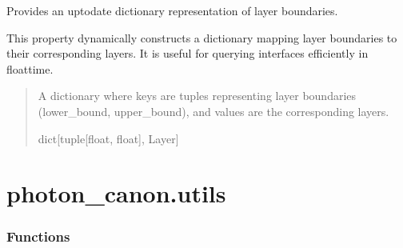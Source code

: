 \documentclass[letterpaper,10pt,english]{sphinxmanual}
\begin{document}
\begin{fulllineitems}
\begin{fulllineitems}
\label{\detokenize{generated/photon_canon.optics:photon_canon.optics.System.stack}}
\pysigstartsignatures
\pysigline
{}
\pysigstopsignatures
\sphinxAtStartPar
Provides an up\sphinxhyphen{}to\sphinxhyphen{}date dictionary representation of layer boundaries.

\sphinxAtStartPar
This property dynamically constructs a dictionary mapping layer boundaries to their corresponding
layers. It is useful for querying interfaces efficiently in float\sphinxhyphen{}time.
\begin{quote}\begin{description}
\sphinxAtStartPar
A dictionary where keys are tuples representing layer boundaries (lower\_bound, upper\_bound),
and values are the corresponding layers.

\sphinxAtStartPar
dict{[}tuple{[}float, float{]}, Layer{]}

\end{description}\end{quote}

\end{fulllineitems}


\end{fulllineitems}


\sphinxstepscope


\section{photon\_canon.utils}
\label{\detokenize{generated/photon_canon.utils:module-photon_canon.utils}}\label{\detokenize{generated/photon_canon.utils:photon-canon-utils}}\label{\detokenize{generated/photon_canon.utils::doc}}\subsubsection*{Functions}
\end{document}
